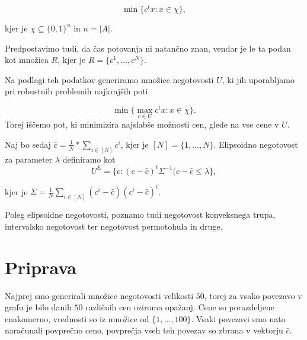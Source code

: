 \documentclass[a4paper, 12 pt]{article}
\theoremstyle{definition} %
\theoremstyle{plain} %
\theoremstyle{definition}
\begin{document}
\begin{equation*}
\min \{c^t x : x \in \chi \},
\end{equation*}

kjer je $\chi \subseteq \{0,1\}^n$ in $n = |A|$.\newline

Predpostavimo tudi, da čas potovanja ni natančno znan, vendar je le ta podan kot množica $R$, kjer je $R = \{c^1, \dots, c^N \}$.\newline

Na podlagi teh podatkov generiramo množice negotovosti $U$, ki jih uporabljamo pri robustnih problemih najkrajših poti

\begin{equation*}
\min \{\max \limits_{c \in U} c^t x : x \in \chi \}.
\end{equation*}
 Torej iščemo pot, ki minimizira najslabše možnosti cen, glede na vse cene v $U$.

\bigskip

Naj bo sedaj $\hat{c} = \frac{1}{N} * \sum_{i \in [N]} c^i $, kjer je $[N] = \{1, \dots , N \}$. Elipsoidno negotovost za parameter $\lambda$ definiramo kot
\begin{equation*}
U^E = \{c: (c - \hat{c})^t \Sigma ^{-1} (c - \hat{c}	\le \lambda \},
\end{equation*}

kjer je $\Sigma = \frac{1}{N} \sum_{i \in [N]} (c^i -\hat{c}) (c^i -\hat{c})^t$.

\bigskip
Poleg elipsoidne negotovosti, poznamo tudi negotovost konveksnega trupa, intervalsko negotovost ter negotovost permotohula in druge. 
\pagebreak


\section{Priprava}

Najprej smo generirali množice negotovosti velikosti $50$, torej za vsako povezavo v grafu je bilo danih $50$ različnih cen oziroma opažanj. Cene so porazdeljene enakomerno, vrednosti so iz množice od $\{1, \dots , 100\} $. Vsaki povezavi smo nato naračunali povprečno ceno, povprečja vseh teh povezav so zbrana v vektorju $\hat{c}$.\newline
\end{document}

